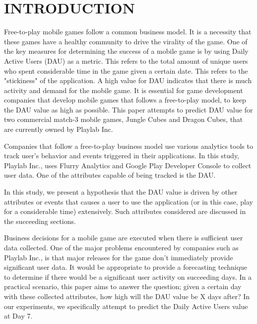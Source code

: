 %
%
%
\section{INTRODUCTION}
Free-to-play mobile games follow a common business model. It is a necessity that these games have a healthy community to drive the virality of the game. One of the key measures for determining the success of a mobile game is by using Daily Active Users (DAU) as a metric. This refers to the total amount of unique users who spent considerable time in the game given a certain date. This refers to the "stickiness" of the application. A high value for DAU indicates that there is much activity and demand for the mobile game. It is essential for game development companies that develop mobile games that follows a free-to-play model, to keep the DAU value as high as possible.  This paper attempts to predict DAU value for two commercial match-3 mobile games, Jungle Cubes and Dragon Cubes, that are currently owned by Playlab Inc.

Companies that follow a free-to-play business model use various analytics tools to track user's behavior and events triggered in their applications. In this study, Playlab Inc., uses Flurry Analytics and Google Play Developer Console to collect user data. One of the attributes capable of being tracked is the DAU.

In this study, we present a hypothesis that the DAU value is driven by other attributes or events that causes a user to use the application (or in this case, play for a considerable time) extensively. Such attributes considered are discussed in the succeeding sections.

Business decisions for a mobile game are executed when there is sufficient user data collected. One of the major problems encountered by companies such as Playlab Inc., is that major releases for the game don't immediately provide significant user data. It would be appropriate to provide a forecasting technique to determine if there would be a significant user activity on succeeding days. In a practical scenario, this paper aims to answer the question; given a certain day with these collected attributes, how high will the DAU value be X days after? In our experiments, we specifically attempt to predict the Daily Active Users value at Day 7.
